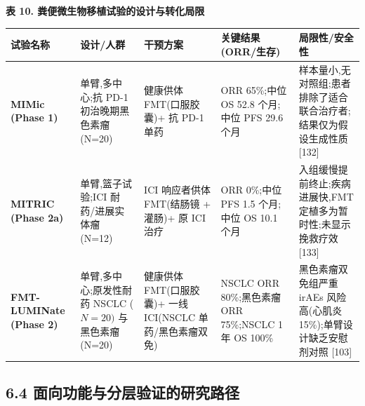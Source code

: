 \documentclass[11pt]{article}
\newcounter{none}
\begin{document}
\textbf{表 10. 粪便微生物移植试验的设计与转化局限}

{\def\LTcaptype{none} %
\begin{longtable}[]{@{}
  >{\raggedright\arraybackslash}p{}
  >{\raggedright\arraybackslash}p{}
  >{\raggedright\arraybackslash}p{}
  >{\raggedright\arraybackslash}p{}
  >{\raggedright\arraybackslash}p{}@{}}
\toprule\noalign{}
\begin{minipage}[b]{\linewidth}\raggedright
试验名称
\end{minipage} & \begin{minipage}[b]{\linewidth}\raggedright
设计/人群
\end{minipage} & \begin{minipage}[b]{\linewidth}\raggedright
干预方案
\end{minipage} & \begin{minipage}[b]{\linewidth}\raggedright
关键结果 (ORR/生存)
\end{minipage} & \begin{minipage}[b]{\linewidth}\raggedright
局限性/安全性
\end{minipage} \\
\midrule\noalign{}
\endhead
\bottomrule\noalign{}
\endlastfoot
\textbf{MIMic (Phase 1)} & 单臂,多中心;抗 PD-1 初治晚期黑色素瘤 (N=20) & 健康供体 FMT(口服胶囊)+ 抗 PD-1 单药 & ORR 65\%;中位 OS 52.8 个月;中位 PFS 29.6 个月 & 样本量小,无对照组;患者排除了适合联合治疗者;结果仅为假设生成性质 {[}132{]} \\
\textbf{MITRIC (Phase 2a)} & 单臂,篮子试验;ICI 耐药/进展实体瘤 (N=12) & ICI 响应者供体 FMT(结肠镜 + 灌肠)+ 原 ICI 治疗 & ORR 0\%;中位 PFS 1.5 个月;中位 OS 10.1 个月 & 入组缓慢提前终止;疾病进展快,FMT 定植多为暂时性;未显示挽救疗效 {[}133{]} \\
\textbf{FMT-LUMINate (Phase 2)} & 单臂,多中心;原发性耐药 NSCLC (\(N=20)\) 与黑色素瘤 (N=20) & 健康供体 FMT(口服胶囊)+ 一线 ICI(NSCLC 单药/黑色素瘤双免) & NSCLC ORR 80\%;黑色素瘤 ORR 75\%;NSCLC 1 年 OS 100\% & 黑色素瘤双免组严重 irAEs 风险高(心肌炎 15\%);单臂设计缺乏安慰剂对照 {[}103{]} \\
\end{longtable}
}

\subsection{6.4 面向功能与分层验证的研究路径}\label{ux9762ux5411ux529fux80fdux4e0eux5206ux5c42ux9a8cux8bc1ux7684ux7814ux7a76ux8defux5f84}
\end{document}
